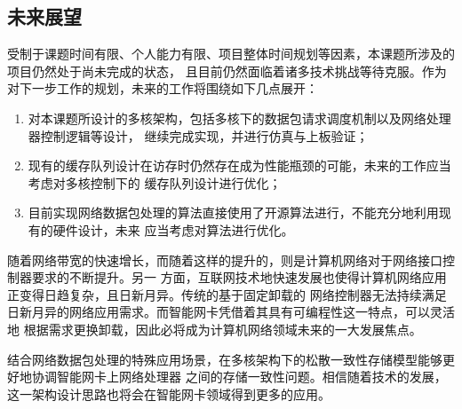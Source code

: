\subsection{未来展望}
\label{section:conclusion_future}


受制于课题时间有限、个人能力有限、项目整体时间规划等因素，本课题所涉及的项目仍然处于尚未完成的状态，
且目前仍然面临着诸多技术挑战等待克服。作为对下一步工作的规划，未来的工作将围绕如下几点展开：

\begin{enumerate}
  \item 对本课题所设计的多核架构，包括多核下的数据包请求调度机制以及网络处理器控制逻辑等设计，
  继续完成实现，并进行仿真与上板验证；
  \item 现有的缓存队列设计在访存时仍然存在成为性能瓶颈的可能，未来的工作应当考虑对多核控制下的
  缓存队列设计进行优化；
  \item 目前实现网络数据包处理的算法直接使用了开源算法进行，不能充分地利用现有的硬件设计，未来
  应当考虑对算法进行优化。
\end{enumerate}

随着网络带宽的快速增长，而随着这样的提升的，则是计算机网络对于网络接口控制器要求的不断提升。另一
方面，互联网技术地快速发展也使得计算机网络应用正变得日趋复杂，且日新月异。传统的基于固定卸载的
网络控制器无法持续满足日新月异的网络应用需求。而智能网卡凭借着其具有可编程性这一特点，可以灵活地
根据需求更换卸载，因此必将成为计算机网络领域未来的一大发展焦点。

结合网络数据包处理的特殊应用场景，在多核架构下的松散一致性存储模型能够更好地协调智能网卡上网络处理器
之间的存储一致性问题。相信随着技术的发展，这一架构设计思路也将会在智能网卡领域得到更多的应用。
